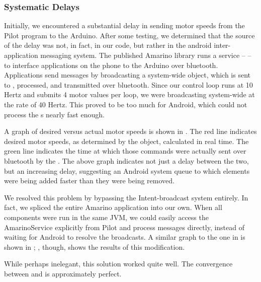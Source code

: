 \subsubsection{Systematic Delays}
Initially, we encountered a substantial delay in sending motor speeds
from the Pilot program to the Arduino.  After some testing, we
determined that the source of the delay was not, in fact, in our code,
but rather in the android inter-application messaging system.  The
published Amarino library runs a service --  --
to interface applications on the phone to the Arduino over bluetooth.
Applications send messages by broadcasting a system-wide 
object, which is sent to , processed, and
transmitted over bluetooth.  Since our control loop runs at 10 Hertz
and submits 4 motor values per loop, we were broadcasting system-wide
 at the rate of 40 Hertz.  This proved to be too much
for Android, which could not process the s nearly fast enough.


A graph of desired versus actual motor speeds is shown in
. The red line indicates desired motor speeds, as
determined by the  object, calculated in real time.
The green line indicates the time at which those commands were
actually sent over bluetooth by the .  The above
graph indicates not just a delay between the two, but an increasing
delay, suggesting an Android system queue to which elements were being
added faster than they were being removed.

We resolved this problem by bypassing the Intent-broadcast system
entirely.  In fact, we spliced the entire Amarino application into our
own.  When all components were run in the same JVM, we could easily
access the AmarinoService explicitly from Pilot and process messages
directly, instead of waiting for Android to resolve the broadcasts. A
similar graph to the one in  is shown in
; , though, shows the results of this
modification.


While perhaps inelegant, this solution worked quite well.  The
convergence between  and  is
approximately perfect.

